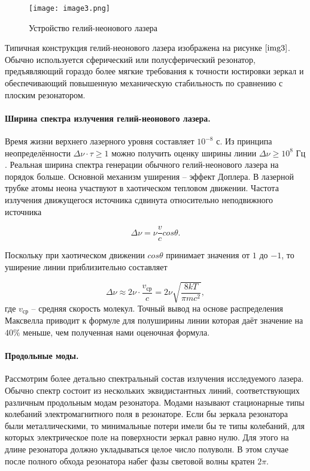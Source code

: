 \documentclass[a4paper,12pt]{article} %
\begin{document}
\begin{figure}[h]
\begin{center}
    \texttt{[image: image3.png]}
\end{center}
    \caption{Устройство гелий-неонового лазера}
    \label{img3}
\end{figure}

Типичная конструкция гелий-неонового лазера изображена на рисунке $\ref{img3}$. Обычно используется сферический или полусферический резонатор, предъявляющий гораздо более мягкие требования к точности юстировки зеркал и обеспечивающий повышенную механическую стабильность по сравнению с плоским резонатором.

\paragraph{Ширина спектра излучения гелий-неонового лазера.} Время жизни верхнего лазерного уровня составляет $10^{-8}\text{ с}$. Из принципа неопределённости $\Delta\nu\cdot\tau\geq1$ можно получить оценку ширины линии $\Delta\nu\geq10^8\text{ Гц}$. Реальная ширина спектра генерации обычного гелий-неонового лазера на порядок больше. Основной механизм уширения -- эффект Доплера. В лазерной трубке атомы неона участвуют в хаотическом тепловом движении. Частота излучения движущегося источника сдвинута относительно неподвижного источника

\[ \Delta\nu=\nu\frac{v}{c}cos{\theta}. \]

Поскольку при хаотическом движении $cos{\theta}$ принимает значения от $1$ до $-1$, то уширение линии приблизительно составляет

\[ \Delta\nu\approx2\nu\cdot\frac{v_{\text{ср}}}{c}=2\nu\sqrt{\frac{8kT}{\pi mc^2}}, \]
где $v_{\text{ср}}$ -- средняя скорость молекул. Точный вывод на основе распределения Максвелла приводит к формуле для полуширины линии которая даёт значение на $40\%$ меньше, чем полученная нами оценочная формула.

\paragraph{Продольные моды.} Рассмотрим более детально спектральный состав излучения исследуемого лазера. Обычно спектр состоит из нескольких эквидистантных линий, соответствующих различным продольным модам резонатора. Модами называют стационарные типы колебаний электромагнитного поля в резонаторе. Если бы зеркала резонатора были металлическими, то минимальные потери имели бы те типы колебаний, для которых электрическое поле на поверхности зеркал равно нулю. Для этого на длине резонатора должно укладываться целое число полуволн. В этом случае после полного обхода резонатора набег фазы световой волны кратен $2\pi$.
\end{document}

